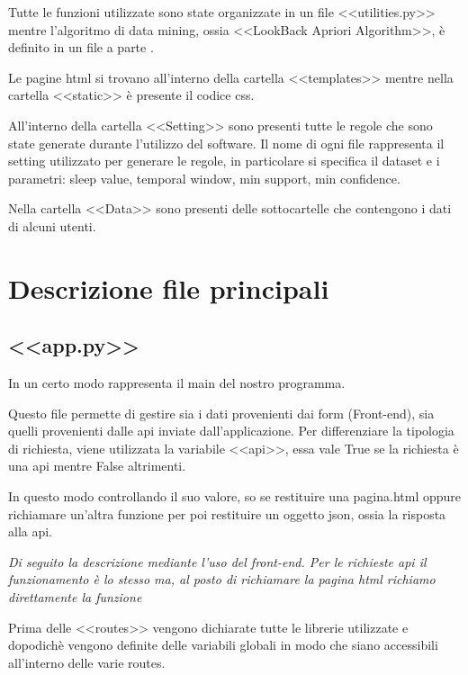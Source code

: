 \documentclass[a4paper]{article}
\begin{document}
Tutte le funzioni utilizzate sono state organizzate in un file <<utilities.py>> mentre l'algoritmo di data mining, ossia <<LookBack Apriori Algorithm>>, è definito in un file a parte .

Le pagine html si trovano all'interno della cartella <<templates>> mentre nella cartella <<static>> è presente il codice css.

All'interno della cartella <<Setting>> sono presenti tutte le regole che sono state generate durante l'utilizzo del software. Il nome di ogni file rappresenta il setting utilizzato per generare le regole, in particolare si specifica il dataset  e i parametri:  sleep value, temporal window, min support, min confidence.

Nella cartella <<Data>> sono presenti delle sottocartelle che contengono i dati di alcuni utenti.

\section{Descrizione file principali}
\subsection{<<app.py>>}
In un certo modo rappresenta il main del nostro programma.

Questo file permette di gestire sia i dati provenienti dai form (Front-end), sia quelli provenienti dalle api inviate dall'applicazione.
Per differenziare la tipologia di richiesta, viene utilizzata la variabile <<api>>, essa vale True se la richiesta è una api mentre False altrimenti. 

In questo modo controllando il suo valore, so se restituire una pagina.html oppure richiamare un'altra funzione per poi restituire un oggetto json, ossia la risposta alla api.


\emph{Di seguito la descrizione mediante l'uso del front-end. Per le richieste api il funzionamento è lo stesso ma, al posto di richiamare la pagina html richiamo direttamente la funzione}


Prima delle <<routes>> vengono dichiarate tutte le librerie  utilizzate e dopodichè vengono definite delle variabili globali in modo che siano accessibili all'interno delle varie routes.
\end{document}
